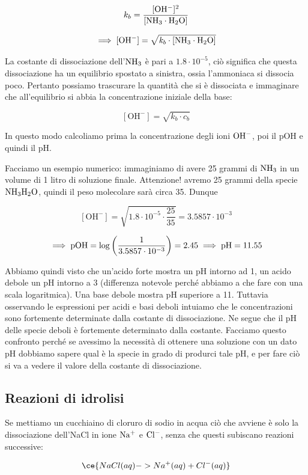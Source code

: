 $$k_b= \frac{\rm{[OH^-]^2}}{\rm{[NH_3 \cdot H_2O]}}$$

$$\implies \rm [OH^-] = \sqrt{ \textit{k}_{\textit{b}} \cdot [NH_3 \cdot H_2O]}$$

La costante di dissociazione dell'$\rm NH_3$ è pari a $1.8 \cdot 10^{-5}$, ciò significa che questa dissociazione ha un equilibrio spostato a sinistra, ossia l'ammoniaca si dissocia poco. Pertanto possiamo trascurare la quantità che si è dissociata e immaginare che all'equilibrio si abbia la concentrazione iniziale della base:

$$[\text{OH}^-] = \sqrt{ k_b \cdot c_b}$$

In questo modo calcoliamo prima la concentrazione degli ioni $\rm OH^-$, poi il pOH e quindi il pH.

\vspace{0.2cm}Facciamo un esempio numerico: immaginiamo di avere 25 grammi di $\rm NH_3$ in un volume di 1 litro di soluzione finale. Attenzione! avremo 25 grammi della specie $\rm NH_3H_2O$, quindi il peso molecolare sarà circa 35. Dunque

$$[\text{OH}^-]=\sqrt{1.8 \cdot 10^{-5} \cdot \frac{25}{35}}=3.5857 \cdot 10^{-3}$$

$$\implies \rm pOH= \log \left( \frac{1}{3.5857 \cdot 10^{-3}} \right)=2.45 \implies pH=11.55$$

Abbiamo quindi visto che un'acido forte mostra un pH intorno ad 1, un acido debole un pH intorno a 3 (differenza notevole perché abbiamo a che fare con una scala logaritmica). Una base debole mostra pH superiore a 11. Tuttavia osservando le espressioni per acidi e basi deboli intuiamo che le concentrazioni sono fortemente determinate dalla costante di dissociazione. Ne segue che il pH delle specie deboli è fortemente determinato dalla costante. Facciamo questo confronto perché se avessimo la necessità di ottenere una soluzione con un dato pH dobbiamo sapere qual è la specie in grado di produrci tale pH, e per fare ciò si va a vedere il valore della costante di dissociazione.

\subsection{Reazioni di idrolisi}
Se mettiamo un cucchiaino di cloruro di sodio in acqua ciò che avviene è solo la dissociazione dell'NaCl in ione $\rm Na^+$ e $\rm Cl^-$, senza che questi subiscano reazioni successive:

$$\ce{NaCl(aq) -> Na^+(aq) + Cl^-(aq)}$$

